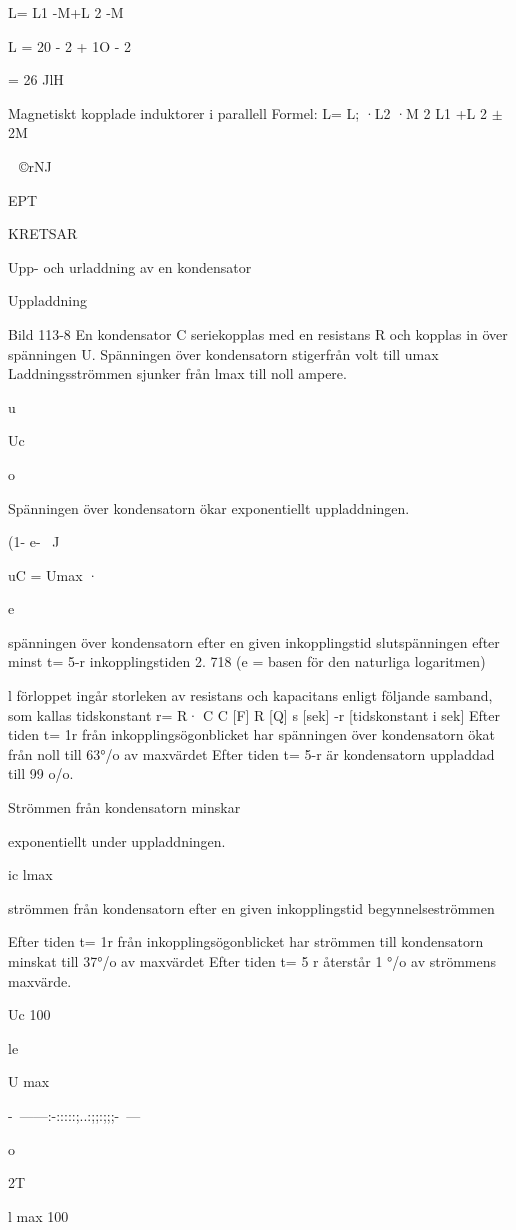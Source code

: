L= L1 -M+L 2 -M

L = 20 - 2 + 1O - 2

= 26 JlH

Magnetiskt kopplade induktorer i parallell
Formel:
L= L; ·L2 ·M 2
L1 +L 2 \(\pm\)2M

~©rNJ

EPT

KRETSAR

Upp- och urladdning av en kondensator

Uppladdning

Bild 113-8
En kondensator C seriekopplas med en resistans R och kopplas in över spänningen U.
Spänningen över kondensatorn stigerfrån
volt till umax
Laddningsströmmen sjunker från lmax till
noll ampere.

u

Uc

o

Spänningen över kondensatorn ökar
exponentiellt uppladdningen.

(1- e-~ J

uC = Umax ·

e

spänningen över kondensatorn efter
en given inkopplingstid
slutspänningen efter minst t= 5-r
inkopplingstiden
2. 718 (e = basen för den naturliga
logaritmen)

l förloppet ingår storleken av resistans
och kapacitans enligt följande samband, som
kallas tidskonstant
r= R· C
C [F] R [Q] s [sek] -r [tidskonstant i sek]
Efter tiden t= 1r från inkopplingsögonblicket har spänningen över kondensatorn
ökat från noll till 63°/o av maxvärdet
Efter tiden t= 5-r är kondensatorn uppladdad till 99 o/o.

Strömmen från kondensatorn minskar

exponentiellt under uppladdningen.

ic
lmax

strömmen från kondensatorn efter en
given inkopplingstid
begynnelseströmmen

Efter tiden t= 1r från inkopplingsögonblicket har strömmen till kondensatorn
minskat till 37°/o av maxvärdet
Efter tiden t= 5 r återstår 1 °/o av strömmens maxvärde.

Uc
100%

le

U max

-~------:-:::::;..:;;:;;;-~---

o

2T

l max
100%


